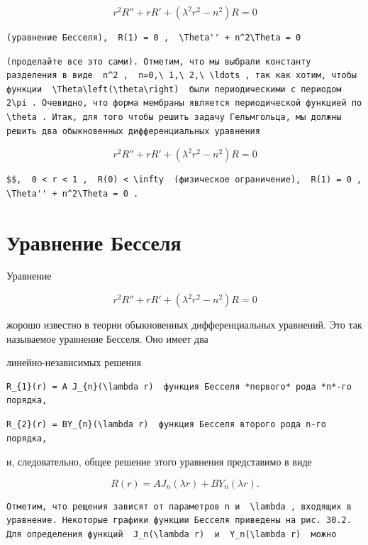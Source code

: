 \documentclass[
  ukrainian,
]{article}
\begin{document}
\[
r^2R'' + rR' + (\lambda^2r^2 - n^2)R = 0
\]

\begin{verbatim}
(уравнение Бесселя),  R(1) = 0 ,  \Theta'' + n^2\Theta = 0
\end{verbatim}

\begin{verbatim}
(проделайте все это сами). Отметим, что мы выбрали константу разделения в виде  n^2 ,  n=0,\ 1,\ 2,\ \ldots , так как хотим, чтобы функции  \Theta\left(\theta\right)  были периодическими с периодом  2\pi . Очевидно, что форма мембраны является периодической функцией по  \theta . Итак, для того чтобы решить задачу Гельмгольца, мы должны решить два обыкновенных дифференциальных уравнения
\end{verbatim}

\[
r^2R'' + rR' + (\lambda^2r^2 - n^2) R = 0
\]

\begin{verbatim}
$$,  0 < r < 1 ,  R(0) < \infty  (физическое ограничение),  R(1) = 0 ,  \Theta'' + n^2\Theta = 0 .
\end{verbatim}

\section{Уравнение
Бесселя}\label{ux443ux440ux430ux432ux43dux435ux43dux438ux435-ux431ux435ux441ux441ux435ux43bux44f}

Уравнение

\[
r^2R'' + rR' + (\lambda^2r^2 - n^2)R = 0
\]

жорошо известно в теории обыкновенных дифференциальных уравнений. Это
так называемое уравнение Бесселя. Оно имеет два

линейно-независимых решения

\begin{verbatim}
R_{1}(r) = A J_{n}(\lambda r)  функция Бесселя *первого* рода *п*-го порядка,
\end{verbatim}

\begin{verbatim}
R_{2}(r) = BY_{n}(\lambda r)  функция Бесселя второго рода n-го порядка,
\end{verbatim}

и, следовательно, общее решение этого уравнения представимо в виде

\[
R(r) = AJ_n(\lambda r) + BY_n(\lambda r).
\]

\begin{verbatim}
Отметим, что рещения зависят от параметров n и  \lambda , входящих в уравнение. Некоторые графики функции Бесселя приведены на рис. 30.2. Для определения функций  J_n(\lambda r)  и  Y_n(\lambda r)  можно
\end{verbatim}
\end{document}
